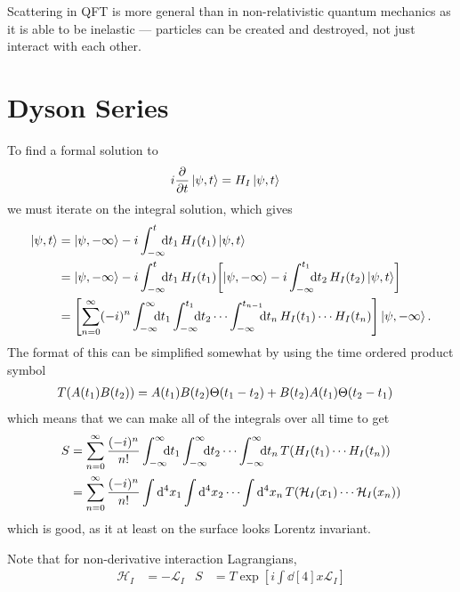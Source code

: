 \documentclass[notes.tex]{subfiles}
\begin{document}
Scattering in QFT is more general than in non-relativistic quantum mechanics as it is able to be inelastic --- particles can be created and destroyed, not just interact with each other.

\section{Dyson Series}
To find a formal solution to
\begin{align*}
	i\pdv{t}\ket{\psi, t} & = H_I \ket{\psi, t}
\end{align*}
we must iterate on the integral solution, which gives
\begin{align*}
	\ket{\psi, t} & = \ket{\psi, -\infty} - i\int^t_{-\infty}\kern-0.5em \dd{t_1} H_I(t_1)\ket{\psi, t}                                                                                                                                \\
	              & = \ket{\psi, -\infty} - i\int^t_{-\infty}\kern-0.5em \dd{t_1} H_I(t_1)\qty[\ket{\psi, -\infty} - i\int^{t_1}_{-\infty}\kern-0.5em \dd{t_2} H_I(t_2)\ket{\psi, t}]                                                  \\
	              & = \qty[\sum_{n=0}^\infty (-i)^n \int_{-\infty}^\infty\kern-0.5em \dd{t_1}\int^{t_1}_{-\infty}\kern-0.5em \dd{t_2} \cdots \int^{t_{n-1}}_{-\infty}\kern-0.5em \dd{t_n}H_I(t_1)\cdots H_I(t_n)]\ket{\psi, -\infty} .
\end{align*}
The format of this can be simplified somewhat by using the time ordered product symbol
\begin{align*}
	T\qty(A(t_1)B(t_2)) & = A(t_1)B(t_2) \Theta(t_1-t_2) +B(t_2) A(t_1) \Theta(t_2 - t_1)
\end{align*}
which means that we can make all of the integrals over all time to get
\begin{align*}
	S & = \sum_{n=0}^\infty \frac{(-i)^n}{n!} \int^{\infty}_{-\infty}\kern-0.5em \dd{t_1}\int^{\infty}_{-\infty}\kern-0.5em \dd{t_2} \cdots \int^{\infty}_{-\infty}\kern-0.5em \dd{t_n}T\qty(H_I(t_1)\cdots H_I(t_n)) \\
	  & = \sum_{n=0}^\infty \frac{(-i)^n}{n!} \int \dd[4]{x_1}\int \dd[4]{x_2} \cdots \int \dd[4]{x_n}T\qty(\mathcal{H}_I(x_1)\cdots \mathcal{H}_I(x_n))
\end{align*}
which is good, as it at least on the surface looks Lorentz invariant.

Note that for non-derivative interaction Lagrangians,
\begin{align*}
	\mathcal{H}_I & = -\mathcal{L}_I                      &
	S             & = T\exp[i\int\dd[4]{x} \mathcal{L}_I]
\end{align*}
\end{document}
